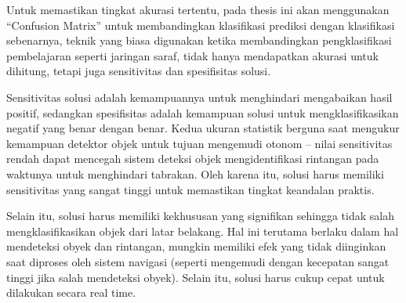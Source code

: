 

Untuk memastikan tingkat akurasi tertentu, pada thesis ini akan menggunakan “Confusion Matrix” untuk membandingkan klasifikasi prediksi dengan klasifikasi sebenarnya, teknik yang biasa digunakan ketika membandingkan pengklasifikasi pembelajaran seperti jaringan saraf, tidak hanya mendapatkan akurasi untuk dihitung, tetapi juga sensitivitas dan spesifisitas solusi. 

Sensitivitas solusi adalah kemampuannya untuk menghindari mengabaikan hasil positif, sedangkan spesifisitas adalah kemampuan solusi untuk mengklasifikasikan negatif yang benar dengan benar. Kedua ukuran statistik berguna saat mengukur kemampuan detektor objek untuk tujuan mengemudi otonom – nilai sensitivitas rendah dapat mencegah sistem deteksi objek mengidentifikasi rintangan pada waktunya untuk menghindari tabrakan. Oleh karena itu, solusi harus memiliki sensitivitas yang sangat tinggi untuk memastikan tingkat keandalan praktis.

Selain itu, solusi harus memiliki kekhususan yang signifikan sehingga tidak salah mengklasifikasikan objek dari latar belakang. Hal ini terutama berlaku dalam hal mendeteksi obyek dan rintangan,  mungkin memiliki efek yang tidak diinginkan saat diproses oleh sistem navigasi (seperti mengemudi dengan kecepatan sangat tinggi jika salah mendeteksi obyek).
Selain itu, solusi harus cukup cepat untuk dilakukan secara real time. 



	
	
